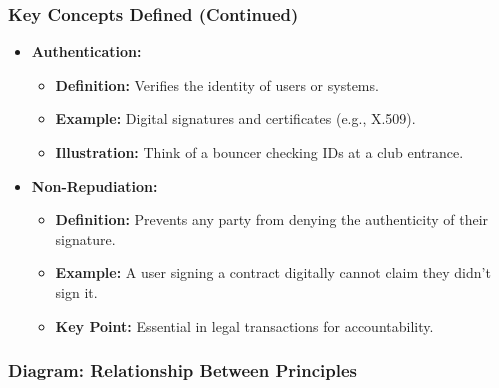 \documentclass{beamer}
\begin{document}
\begin{frame}
    \frametitle{Key Concepts Defined (Continued)}
    \begin{itemize}
        \item \textbf{Authentication:}
            \begin{itemize}
                \item \textbf{Definition:} Verifies the identity of users or systems.
                \item \textbf{Example:} Digital signatures and certificates (e.g., X.509).
                \item \textbf{Illustration:} Think of a bouncer checking IDs at a club entrance.
            \end{itemize}

        \item \textbf{Non-Repudiation:}
            \begin{itemize}
                \item \textbf{Definition:} Prevents any party from denying the authenticity of their signature.
                \item \textbf{Example:} A user signing a contract digitally cannot claim they didn’t sign it.
                \item \textbf{Key Point:} Essential in legal transactions for accountability.
            \end{itemize}
    \end{itemize}
\end{frame}

\begin{frame}[fragile]
    \frametitle{Diagram: Relationship Between Principles}
    \begin{center}
    \end{center}
\end{frame}
\end{document}

